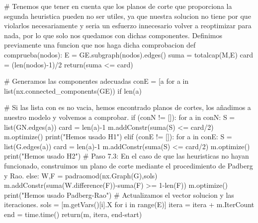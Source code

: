 \documentclass[twoside,a4paper,openright,12pt,tikz]{book}
\begin{document}
\begin{pythone}
        # Tenemos que tener en cuenta que los planos de corte que proporciona la segunda heuristica pueden no ser utiles, ya que nuestra solucion no tiene por que violarlos necesariamente y seria un esfuerzo innecesario volver a reoptimizar para nada, por lo que solo nos quedamos con dichas componentes. Definimos previamente una funcion que nos haga dicha comprobacion
        def comprueba(nodos):
            E = GE.subgraph(nodos).edges()
            suma = totalcap(M,E)
            card = (len(nodos)-1)/2
            return(suma <= card)
        
        # Generamos las componentes adecuadas
        conE = [a for a in list(nx.connected_components(GE)) if len(a) %

        # Si las lista con es no vacia, hemos encontrado planos de cortes, los añadimos a nuestro modelo y volvemos a comprobar. 
        if (conN != []):
            for a in conN:
                S = list(GN.edges(a))
                card = len(a)-1
                m.addConstr(suma(S) <= card/2) 
            m.optimize()
            print("Hemos usado H1")
        elif (conE != []):
            for a in conE:
                S = list(G.edges(a))
                card = len(a)-1
                m.addConstr(suma(S) <= card/2) 
            m.optimize()
            print("Hemos usado H2")
        # Paso 7.3: En el caso de que las heuristicas no hayan funcionado, construimos un plano de corte mediante el procedimiento de Padberg y Rao.
        else:        
            W,F = padraomod(nx.Graph(G),sols)
            m.addConstr(suma(W.difference(F))-suma(F) >= 1-len(F))
            m.optimize()
            print("Hemos usado Padberg-Rao")
        # Actualizamos el vector solucion y las iteraciones.
        sols = [m.getVars()[i].X for i in range(E)]
        itera = itera + m.IterCount
    end = time.time()
    return(m, itera, end-start)
\end{pythone}
\newpage
\end{document}

